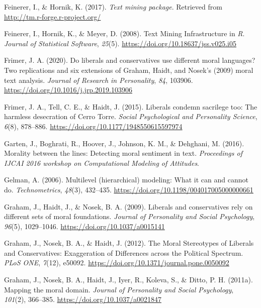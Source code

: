\documentclass[
  man,floatsintext]{apa6}
\newlength{\cslhangindent}
\newenvironment{CSLReferences}[2] %
 {\begin{list}{}{%
  \setlength{\itemindent}{0pt}
  \setlength{\leftmargin}{0pt}
  \setlength{\parsep}{0pt}
  \ifodd #1
   \setlength{\leftmargin}{\cslhangindent}
   \setlength{\itemindent}{-1\cslhangindent}
  \fi
  \setlength{\itemsep}{#2\baselineskip}}}
 {\end{list}}
\begin{document}
\begin{CSLReferences}{1}{0}
Feinerer, I., \& Hornik, K. (2017). \emph{{Text mining package}}. Retrieved from \url{http://tm.r-forge.r-project.org/}

Feinerer, I., Hornik, K., \& Meyer, D. (2008). Text Mining Infrastructure in {\emph{R}}. \emph{Journal of Statistical Software}, \emph{25}(5). \url{https://doi.org/10.18637/jss.v025.i05}

Frimer, J. A. (2020). Do liberals and conservatives use different moral languages? Two replications and six extensions of {G}raham, {H}aidt, and {N}osek's (2009) moral text analysis. \emph{Journal of Research in Personality}, \emph{84}, 103906. \url{https://doi.org/10.1016/j.jrp.2019.103906}

Frimer, J. A., Tell, C. E., \& Haidt, J. (2015). Liberals condemn sacrilege too: The harmless desecration of {C}erro {T}orre. \emph{Social Psychological and Personality Science}, \emph{6}(8), 878--886. \url{https://doi.org/10.1177/1948550615597974}

Garten, J., Boghrati, R., Hoover, J., Johnson, K. M., \& Dehghani, M. (2016). Morality between the lines: Detecting moral sentiment in text. \emph{{Proceedings of IJCAI 2016 workshop on Computational Modeling of Attitudes}}.

Gelman, A. (2006). {Multilevel (hierarchical) modeling: What it can and cannot do}. \emph{Technometrics}, \emph{48}(3), 432--435. \url{https://doi.org/10.1198/004017005000000661}

Graham, J., Haidt, J., \& Nosek, B. A. (2009). {Liberals and conservatives rely on different sets of moral foundations.} \emph{Journal of Personality and Social Psychology}, \emph{96}(5), 1029--1046. \url{https://doi.org/10.1037/a0015141}

Graham, J., Nosek, B. A., \& Haidt, J. (2012). {The Moral Stereotypes of Liberals and Conservatives: Exaggeration of Differences across the Political Spectrum}. \emph{PLoS ONE}, \emph{7}(12), e50092. \url{https://doi.org/10.1371/journal.pone.0050092}

Graham, J., Nosek, B. A., Haidt, J., Iyer, R., Koleva, S., \& Ditto, P. H. (2011a). Mapping the moral domain. \emph{Journal of Personality and Social Psychology}, \emph{101}(2), 366--385. \url{https://doi.org/10.1037/a0021847}


\end{CSLReferences}
\end{document}
